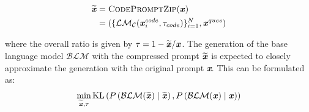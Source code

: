 \begin{align}
\widetilde{\textbf{\textit{x}}} &= \textsc{CodePromptZip}(\textbf{\textit{x}}) \\
&= (\{\mathcal{LM_C}(\textbf{\textit{x}}_i^{code},\tau_{code} )\}_{i=1}^N, \textbf{\textit{x}}^{ques}) \nonumber
\end{align}

\noindent where the overall ratio is given by $\tau=1-\widetilde{\textbf{\textit{x}}}/\textbf{\textit{x}}$.
The generation of the base language model $\mathcal{\mathcal{BLM}}$ with the compressed prompt $\widetilde{\textbf{\textit{x}}}$ is expected to closely approximate the generation with the original prompt \textbf{\textit{x}}. This can be formulated as: 
\begin{align}
\min _{\widetilde{\boldsymbol{x}}, \tau} \operatorname{KL}\left(P\left(\mathcal{BLM}(\widetilde{\textbf{\textit{x}}})\mid \widetilde{\textbf{\textit{x}}}\right), P\left(\mathcal{BLM}(\textbf{\textit{x}}) \mid \textbf{\textit{x}}\right)\right)
\end{align}


